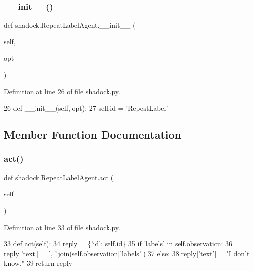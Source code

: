 \subsubsection{\texorpdfstring{\+\_\+\+\_\+init\+\_\+\+\_\+()}{\_\_init\_\_()}}
{\footnotesize\ttfamily def shadock.\+Repeat\+Label\+Agent.\+\_\+\+\_\+init\+\_\+\+\_\+ (\begin{DoxyParamCaption}\item[{}]{self,  }\item[{}]{opt }\end{DoxyParamCaption})}



Definition at line 26 of file shadock.\+py.


\begin{DoxyCode}
26     \textcolor{keyword}{def }\_\_init\_\_(self, opt):
27         self.id = \textcolor{stringliteral}{'RepeatLabel'}
\end{DoxyCode}


\subsection{Member Function Documentation}
\mbox{\label{classshadock_1_1RepeatLabelAgent_aec9b605ede2ba59d9a46aa913bd15649}} 
\subsubsection{\texorpdfstring{act()}{act()}}
{\footnotesize\ttfamily def shadock.\+Repeat\+Label\+Agent.\+act (\begin{DoxyParamCaption}\item[{}]{self }\end{DoxyParamCaption})}



Definition at line 33 of file shadock.\+py.


\begin{DoxyCode}
33     \textcolor{keyword}{def }act(self):
34         reply = \{\textcolor{stringliteral}{'id'}: self.id\}
35         \textcolor{keywordflow}{if} \textcolor{stringliteral}{'labels'} \textcolor{keywordflow}{in} self.observation:
36             reply[\textcolor{stringliteral}{'text'}] = \textcolor{stringliteral}{', '}.join(self.observation[\textcolor{stringliteral}{'labels'}])
37         \textcolor{keywordflow}{else}:
38             reply[\textcolor{stringliteral}{'text'}] = \textcolor{stringliteral}{"I don't know."}
39         \textcolor{keywordflow}{return} reply
\end{DoxyCode}
\mbox{\label{classshadock_1_1RepeatLabelAgent_a72e70867bd2e94077d26b52a6040914e}} 
